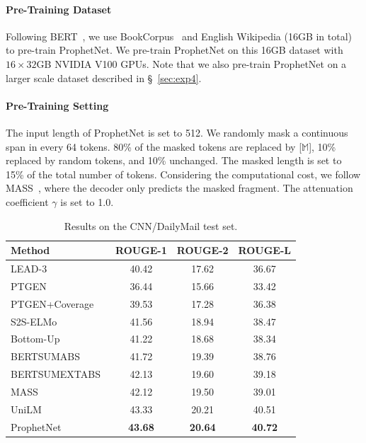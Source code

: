\documentclass[11pt,a4paper]{article}
\begin{document}
\paragraph{Pre-Training Dataset} 
Following BERT~\cite{devlin2018bert}, we use BookCorpus~\cite{zhu2015aligning} and English Wikipedia (16GB in total) to pre-train ProphetNet.
We pre-train ProphetNet on this 16GB dataset with $16 \times 32$GB NVIDIA V100 GPUs.
Note that we also pre-train ProphetNet on a larger scale dataset described in \S~\ref{sec:exp4}.


\paragraph{Pre-Training Setting}
The input length of ProphetNet is set to 512.
We randomly mask a continuous span in every 64 tokens. 
80\% of the masked tokens are replaced by [$\mathbb{M}$], 10\% replaced by random tokens, and 10\% unchanged. 
The masked length is set to 15\% of the total number of tokens. Considering the computational cost, we follow MASS~\cite{song2019mass}, where the decoder only predicts the masked fragment. The attenuation coefficient $\gamma$ is set to 1.0.




\begin{table}[th] 
\small
\begin{center}
  \begin{tabular}{lccc}
    \toprule
 Method & ROUGE-1 & ROUGE-2 & ROUGE-L \\
 \midrule
LEAD-3~\cite{nallapati2017summarunner} &40.42 &17.62 &36.67 \\
PTGEN~\cite{see2017get}  & 36.44 & 15.66 & 33.42\\
PTGEN+Coverage~\cite{see2017get}  &39.53 &17.28 &36.38\\
S2S-ELMo~\cite{edunov2019pre}  & 41.56 & 18.94 & 38.47\\
Bottom-Up~\cite{gehrmann2018bottom}  & 41.22 & 18.68 & 38.34\\
  BERTSUMABS~\cite{liu2019text} & 41.72 & 19.39 & 38.76\\
BERTSUMEXTABS~\cite{liu2019text} & 42.13 & 19.60 &39.18 \\ 
  MASS~\cite{song2019mass} & 42.12  &19.50&  39.01\\
 UniLM~\cite{dong2019unified} & 43.33  &20.21&   40.51\\
  \hline
  ProphetNet &\textbf{43.68} & \textbf{20.64} &  \textbf{40.72}\\
 \bottomrule
\end{tabular}
\end{center}
\caption{Results on the CNN/DailyMail test set.}
\label{tab:cnn} 
\end{table}
\end{document}
